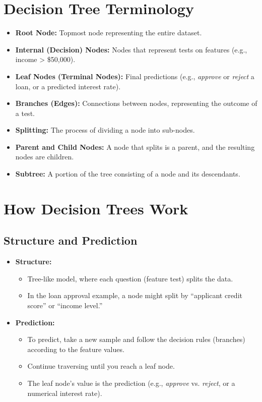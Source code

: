 \documentclass[10pt]{article}
\begin{document}
\section{Decision Tree Terminology}
\begin{itemize}
    \item \textbf{Root Node:} Topmost node representing the entire dataset.
    \item \textbf{Internal (Decision) Nodes:} Nodes that represent tests on features (e.g., income > \$50{,}000).
    \item \textbf{Leaf Nodes (Terminal Nodes):} Final predictions (e.g., \textit{approve} or \textit{reject} a loan, or a predicted interest rate).
    \item \textbf{Branches (Edges):} Connections between nodes, representing the outcome of a test.
    \item \textbf{Splitting:} The process of dividing a node into sub-nodes.
    \item \textbf{Parent and Child Nodes:} A node that splits is a parent, and the resulting nodes are children.
    \item \textbf{Subtree:} A portion of the tree consisting of a node and its descendants.
\end{itemize}

\section{How Decision Trees Work}

\subsection{Structure and Prediction}
\begin{itemize}
    \item \textbf{Structure:}
    \begin{itemize}
        \item Tree-like model, where each question (feature test) splits the data.
        \item In the loan approval example, a node might split by ``applicant credit score'' or ``income level.''
    \end{itemize}

    \item \textbf{Prediction:}
    \begin{itemize}
        \item To predict, take a new sample and follow the decision rules (branches) according to the feature values.
        \item Continue traversing until you reach a leaf node.
        \item The leaf node's value is the prediction (e.g., \textit{approve} vs. \textit{reject}, or a numerical interest rate).
    \end{itemize}
\end{itemize}
\end{document}
